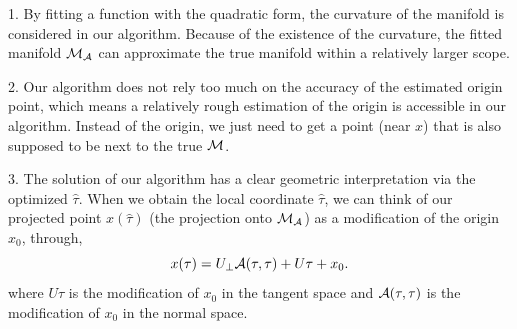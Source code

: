 \documentclass{article}
\theoremstyle{remark}
\begin{document}
1. By fitting a function with the quadratic form, the curvature of the manifold is considered in our algorithm. Because of the existence of the curvature, the fitted manifold ${\cal M}_{\cal A}$ can approximate the true manifold within a relatively larger scope.

2. Our algorithm does not rely too much on the accuracy of the estimated origin point, which means a relatively rough estimation of the origin is accessible in our algorithm. Instead of the origin, we just need to get a point (near $x$) that is also supposed to be next to the true $\cal M$.

3. The solution of our algorithm has a clear geometric interpretation via the optimized $\hat{\tau}$.  When we obtain the local coordinate $\hat{\tau}$, we can think of our projected point $x(\hat{\tau})$ (the projection onto ${\cal M}_{\cal A}$) as a modification of the origin $x_0$, through,
\[
x(\tau) = U_\perp {\cal A}(\tau,\tau) + U\tau + x_0. 
\]
where $U\tau$ is the modification of $x_0$ in the tangent space and ${\cal A}(\tau,\tau)$ is the modification of $x_0$ in the normal space.
\end{document}
